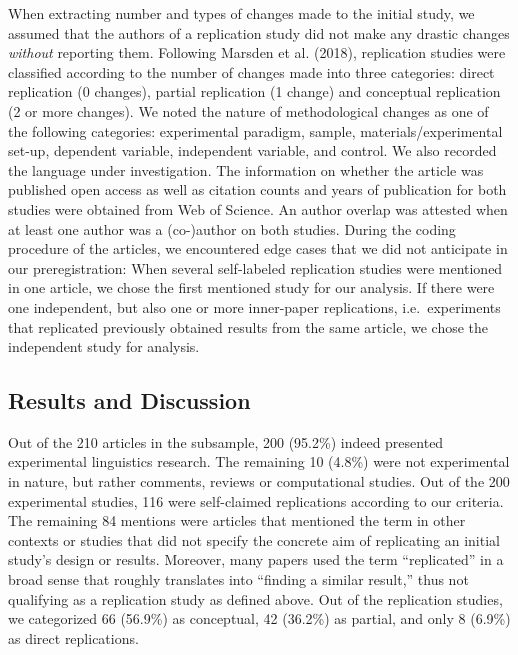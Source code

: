\documentclass[]{elsarticle} %
\begin{document}
When extracting number and types of changes made to the initial study, we assumed that the authors of a replication study did not make any drastic changes \emph{without} reporting them.
Following Marsden et al. (2018), replication studies were classified according to the number of changes made into three categories: direct replication (0 changes), partial replication (1 change) and conceptual replication (2 or more changes).
We noted the nature of methodological changes as one of the following categories:
experimental paradigm, sample, materials/experimental set-up, dependent variable, independent variable, and control.
We also recorded the language under investigation.
The information on whether the article was published open access as well as citation counts and years of publication for both studies were obtained from Web of Science.
An author overlap was attested when at least one author was a (co-)author on both studies.
During the coding procedure of the articles, we encountered edge cases that we did not anticipate in our preregistration: When several self-labeled replication studies were mentioned in one article, we chose the first mentioned study for our analysis. If there were one independent, but also one or more inner-paper replications, i.e.~experiments that replicated previously obtained results from the same article, we chose the independent study for analysis.

\hypertarget{results-and-discussion-1}{%
\subsection{Results and Discussion}\label{results-and-discussion-1}}

Out of the 210 articles in the subsample, 200 (95.2\%) indeed presented experimental linguistics research. The remaining 10 (4.8\%) were not experimental in nature, but rather comments, reviews or computational studies. Out of the 200 experimental studies, 116 were self-claimed replications according to our criteria. The remaining 84 mentions were articles that mentioned the term in other contexts or studies that did not specify the concrete aim of replicating an initial study's design or results. Moreover, many papers used the term ``replicated'' in a broad sense that roughly translates into ``finding a similar result,'' thus not qualifying as a replication study as defined above.
Out of the replication studies, we categorized 66 (56.9\%) as conceptual, 42 (36.2\%) as partial, and only 8 (6.9\%) as direct replications.
\end{document}
